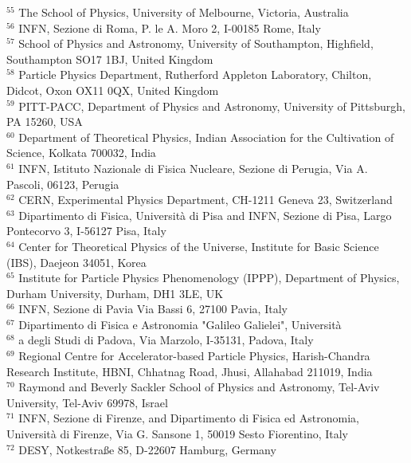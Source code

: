 {$^{55}$ The School of Physics, University of Melbourne, Victoria, Australia \\ 
$^{56}$ INFN, Sezione di Roma, P. le A. Moro 2, I-00185 Rome, Italy \\ 
$^{57}$ School of Physics and Astronomy, University of Southampton, Highfield, Southampton SO17 1BJ, United Kingdom \\ 
$^{58}$ Particle Physics Department, Rutherford Appleton Laboratory, Chilton, Didcot, Oxon OX11 0QX, United Kingdom \\ 
$^{59}$ PITT-PACC, Department of Physics and Astronomy, University of Pittsburgh, PA 15260, USA \\ 
$^{60}$ Department of Theoretical Physics, Indian Association for the Cultivation of Science, Kolkata 700032, India \\ 
$^{61}$ INFN, Istituto Nazionale di Fisica Nucleare, Sezione di Perugia, Via A. Pascoli, 06123, Perugia \\ 
$^{62}$ CERN, Experimental Physics Department, CH-1211 Geneva 23, Switzerland \\ 
$^{63}$ Dipartimento di Fisica, Universit\`a di Pisa and INFN, Sezione di Pisa, Largo Pontecorvo 3, I-56127 Pisa, Italy \\ 
$^{64}$ Center for Theoretical Physics of the Universe, Institute for Basic Science (IBS), Daejeon 34051, Korea \\ 
$^{65}$ Institute for Particle Physics Phenomenology (IPPP), Department of Physics, Durham University, Durham, DH1 3LE, UK \\ 
$^{66}$ INFN, Sezione di Pavia Via Bassi 6, 27100 Pavia, Italy \\ 
$^{67}$ Dipartimento di Fisica e Astronomia "Galileo Galielei", Universit\`{a \\ 
$^{68}$ a} degli Studi di Padova, Via Marzolo, I-35131, Padova, Italy \\ 
$^{69}$ Regional Centre for Accelerator-based Particle Physics, Harish-Chandra Research Institute, HBNI, Chhatnag Road, Jhusi, Allahabad 211019, India \\ 
$^{70}$ Raymond and Beverly Sackler School of Physics and Astronomy, Tel-Aviv University, Tel-Aviv 69978, Israel \\ 
$^{71}$ INFN, Sezione di Firenze, and Dipartimento di Fisica ed Astronomia, Universit\`a di Firenze,  Via G. Sansone 1, 50019 Sesto Fiorentino, Italy \\ 
$^{72}$ DESY, Notkestra\ss e 85, D-22607 Hamburg, Germany \\ 
}
